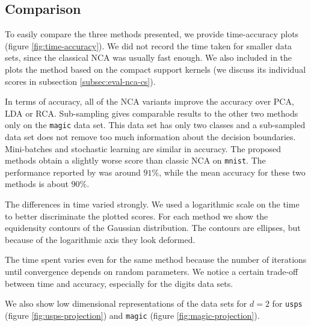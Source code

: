     \subsection{Comparison}
    \label{subsec:eval-comparison}

    To easily compare the three methods presented, we provide time-accuracy plots (figure \ref{fig:time-accuracy}). We did not record the time taken for smaller data sets, since the classical NCA was usually fast enough. We also included in the plots the method based on the compact support kernels (we discuss its individual scores in subsection \ref{subsec:eval-nca-cs}). 

    In terms of accuracy, all of the NCA variants improve the accuracy over PCA, LDA or RCA\@. Sub-sampling gives comparable results to the other two methods only on the \texttt{magic} data set. This data set has only two classes and a sub-sampled data set does not remove too much information about the decision boundaries. Mini-batches and stochastic learning are similar in accuracy. The proposed methods obtain a slightly worse score than classic NCA on \texttt{mnist}. The performance reported by \citet{singh2010} was around $91\%$, while the mean accuracy for these two methods is about $90\%$. 

    The differences in time varied strongly. We used a logarithmic scale on the time to better discriminate the plotted scores. For each method we show the equidensity contours of the Gaussian distribution. The contours are ellipses, but because of the logarithmic axis they look deformed. 

    The time spent varies even for the same method because the number of iterations until convergence depends on random parameters. We notice a certain trade-off between time and accuracy, especially for the digits data sets.

    We also show low dimensional representations of the data sets for $d=2$ for \texttt{usps} (figure \ref{fig:usps-projection}) and \texttt{magic} (figure \ref{fig:magic-projection}). 
    

